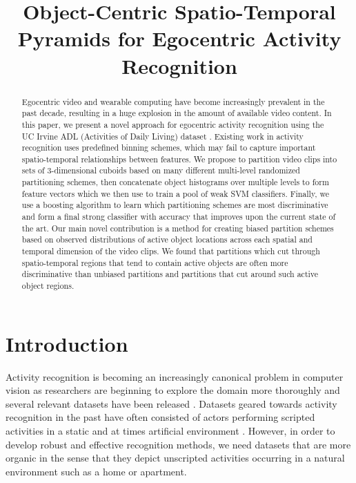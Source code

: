 \documentclass{bmvc2k}
\title{Object-Centric Spatio-Temporal Pyramids for Egocentric Activity Recognition}
\begin{document}
\maketitle

\begin{abstract}
	Egocentric video and wearable computing have become increasingly
	prevalent in the past decade, resulting in a huge explosion in the amount
	of available video content. In this paper, we present a novel approach for
	egocentric activity recognition using the UC Irvine ADL (Activities of Daily Living)
	dataset \cite{Ramanan12}.  
  Existing work in activity recognition uses predefined binning schemes,
  which may fail to capture important spatio-temporal relationships between
  features.
  We propose to partition video clips into sets of
	3-dimensional cuboids based on many different multi-level randomized partitioning
	schemes, then concatenate object histograms
	over multiple levels to form feature vectors which we then use to train a pool
	of weak SVM classifiers. 
	Finally, we use a boosting algorithm to learn which partitioning schemes are
  most discriminative and form a
	final strong classifier with accuracy that improves upon the current state of
	the art. Our main novel contribution is a method for
	creating biased partition schemes based on observed distributions of
	active object locations across each spatial and temporal dimension of the video clips.
  We found that partitions which cut through spatio-temporal regions that
  tend to contain active objects are often more discriminative than
  unbiased partitions and 
  partitions that cut around such active object regions.
\end{abstract}

\section{Introduction}
	Activity recognition is becoming an increasingly canonical problem in
	computer vision as researchers are beginning to explore the domain more
  thoroughly and several relevant datasets have been released 
  \cite{Schuldt04, Rodriguez08, Fathi11, Ramanan12}. 
	Datasets geared towards activity recognition in the past have often
	consisted of actors performing scripted activities in a static and at
  times artificial environment \cite{Schuldt04}. However, in order to develop robust and effective
	recognition methods, we need datasets that are more organic in the sense that they
	depict unscripted activities occurring in a natural environment such as a home or
	apartment.
\end{document}
